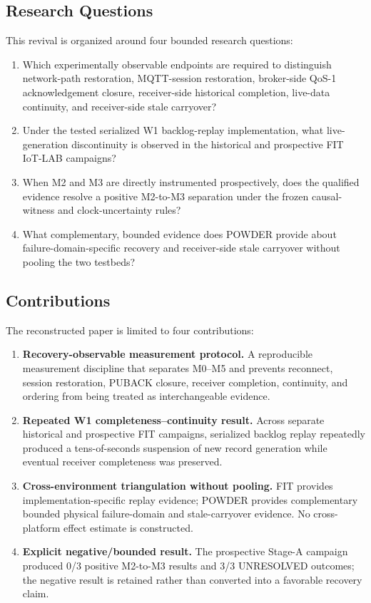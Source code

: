 \documentclass[journal]{IEEEtran}
\begin{document}

\subsection{Research Questions}
This revival is organized around four bounded research questions:
\begin{enumerate}
    \item[\textbf{RQ1}] Which experimentally observable endpoints are required to distinguish network-path restoration, MQTT-session restoration, broker-side QoS-1 acknowledgement closure, receiver-side historical completion, live-data continuity, and receiver-side stale carryover?
    \item[\textbf{RQ2}] Under the tested serialized W1 backlog-replay implementation, what live-generation discontinuity is observed in the historical and prospective FIT IoT-LAB campaigns?
    \item[\textbf{RQ3}] When M2 and M3 are directly instrumented prospectively, does the qualified evidence resolve a positive M2-to-M3 separation under the frozen causal-witness and clock-uncertainty rules?
    \item[\textbf{RQ4}] What complementary, bounded evidence does POWDER provide about failure-domain-specific recovery and receiver-side stale carryover without pooling the two testbeds?
\end{enumerate}

\subsection{Contributions}
The reconstructed paper is limited to four contributions:
\begin{enumerate}
    \item[\textbf{A1}] \textbf{Recovery-observable measurement protocol.} A reproducible measurement discipline that separates M0--M5 and prevents reconnect, session restoration, PUBACK closure, receiver completion, continuity, and ordering from being treated as interchangeable evidence.
    \item[\textbf{A2}] \textbf{Repeated W1 completeness--continuity result.} Across separate historical and prospective FIT campaigns, serialized backlog replay repeatedly produced a tens-of-seconds suspension of new record generation while eventual receiver completeness was preserved.
    \item[\textbf{A3}] \textbf{Cross-environment triangulation without pooling.} FIT provides implementation-specific replay evidence; POWDER provides complementary bounded physical failure-domain and stale-carryover evidence. No cross-platform effect estimate is constructed.
    \item[\textbf{A4}] \textbf{Explicit negative/bounded result.} The prospective Stage-A campaign produced 0/3 positive M2-to-M3 results and 3/3 UNRESOLVED outcomes; the negative result is retained rather than converted into a favorable recovery claim.
\end{enumerate}
\end{document}
